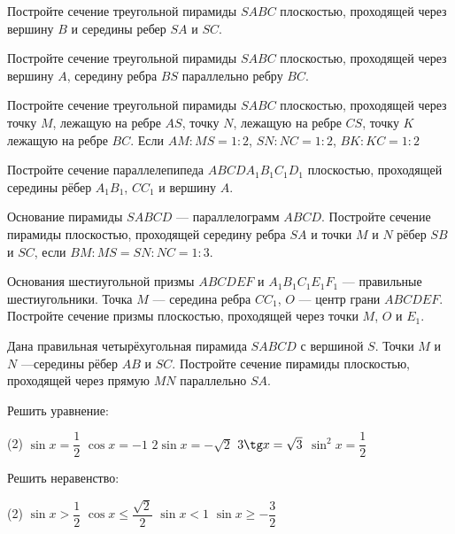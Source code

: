 \begin{consultation}
	\begin{listofex}
		\item Постройте сечение треугольной пирамиды \(SABC\) плоскостью, проходящей через вершину \(B\) и середины ребер \(SA\) и \(SC\).
		\item Постройте сечение треугольной пирамиды \(SABC\) плоскостью, проходящей через вершину \(A\), середину ребра \(BS\) параллельно ребру \(BC\).
		\item  Постройте сечение треугольной пирамиды \(SABC\) плоскостью, проходящей через точку \(M\), лежащую на ребре \(AS\), точку \(N\), лежащую на ребре \(CS\), точку \(K\) лежащую на ребре \(BC\). Если \(AM:MS=1:2\), \(SN:NC=1:2\), \(BK:KC=1:2\)
		\item  Постройте сечение параллелепипеда \(ABCDA_1B_1C_1D_1\) плоскостью, проходящей середины рёбер \(A_1B_1\), \(CC_1\) и вершину \(A\).
		\item Основание пирамиды \(SABCD\) — параллелограмм \(ABCD\). Постройте сечение пирамиды плоскостью, проходящей середину ребра \(SA\) и точки \(M\) и \(N\) рёбер \(SB\) и \(SC\), если \(BM:MS=SN:NC =1:3\).
		\item  Основания шестиугольной призмы \(ABCDEF\) и \(A_1B_1C_1E_1F_1\) --- правильные шестиугольники. Точка \(M\) --- середина ребра \(CC_1\), \(O\) --- центр грани \(ABCDEF\). Постройте сечение призмы плоскостью, проходящей через точки \(M\), \(O\) и \(E_1\).
		\item  Дана правильная четырёхугольная пирамида \(SABCD\) с вершиной \(S\). Точки \(M\) и \(N\) —середины рёбер \(AB\) и \(SC\). Постройте сечение пирамиды плоскостью, проходящей через прямую \(MN\) параллельно \(SA\).
		\newpage
		
		\item Решить уравнение:
		\begin{tasks}(2)
			\task \( \sin x = \dfrac{1}{2} \)
			\task \( \cos x = -1 \)
			\task \( 2\sin x = -\sqrt{2} \)
			\task \( 3\tg x = \sqrt{3} \)
			\task \( \sin^2 x = \dfrac{1}{2} \)
		\end{tasks}
		\item Решить неравенство:
		\begin{tasks}(2)
			\task \( \sin x > \dfrac{1}{2} \)
			\task \( \cos x \le \dfrac{\sqrt{2}}{2} \)
			\task \( \sin x < 1 \)
			\task \( \sin x \ge -\dfrac{3}{2}\)
		\end{tasks}
	\end{listofex}
\end{consultation}
